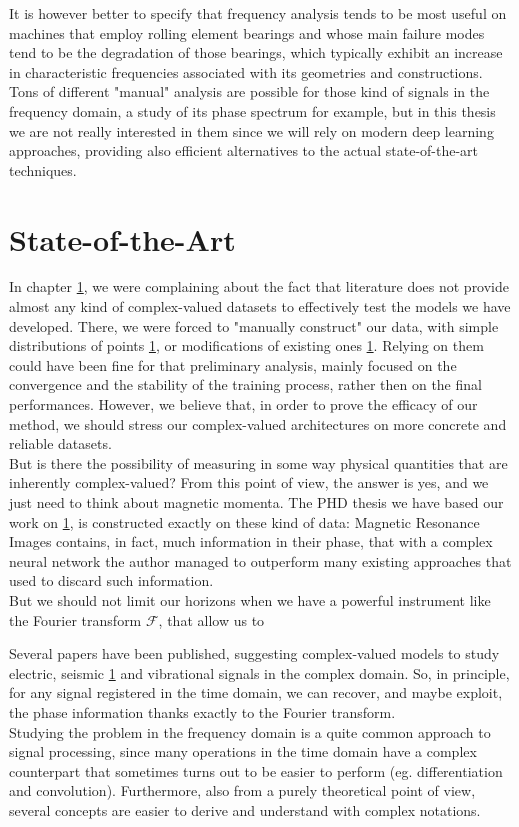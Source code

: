 \documentclass[../main.tex]{subfiles}
\begin{document}
It is however better to specify that frequency analysis tends to be most useful on machines that employ rolling element bearings and whose main failure modes tend to be the degradation of those bearings, which typically exhibit an increase in characteristic frequencies associated with its geometries and constructions.\\
Tons of different "manual" analysis are possible for those kind of signals in the frequency domain, a study of its phase spectrum for example, but in this thesis we are not really interested in them since we will rely on modern deep learning approaches, providing also efficient alternatives to the actual state-of-the-art techniques.


\section{State-of-the-Art}

In chapter \ref{}, we were complaining about the fact that literature does not provide almost any kind of complex-valued datasets to effectively test the models we have developed. There, we were forced to "manually construct" our data, with simple distributions of points \ref{}, or modifications of existing ones \ref{}. Relying on them could have been fine for that preliminary analysis, mainly focused on the convergence and the stability of the training process, rather then on the final performances. However, we believe that, in order to prove the efficacy of our method, we should stress our complex-valued architectures on more concrete and reliable datasets.\\
But is there the possibility of measuring in some way physical quantities that are inherently complex-valued? From this point of view, the answer is yes, and we just need to think about magnetic momenta. The PHD thesis we have based our work on \ref{}, is constructed exactly on these kind of data: Magnetic Resonance Images contains, in fact, much information in their phase, that with a complex neural network the author managed to outperform many existing approaches that used to discard such information.\\
But we should not limit our horizons when we have a powerful instrument like the Fourier transform $\mathcal{F}$, that allow us to

Several papers have been published, suggesting complex-valued models to study electric, seismic \ref{} and vibrational signals in the complex domain. So, in principle, for any signal registered in the time domain, we can recover, and maybe exploit, the phase information thanks exactly to the Fourier transform.\\
Studying the problem in the frequency domain is a quite common approach to signal processing, since many operations in the time domain have a complex counterpart that sometimes turns out to be easier to perform (eg. differentiation and convolution). Furthermore, also from a purely theoretical point of view, several concepts are easier to derive and understand with complex notations. 	
\end{document}
